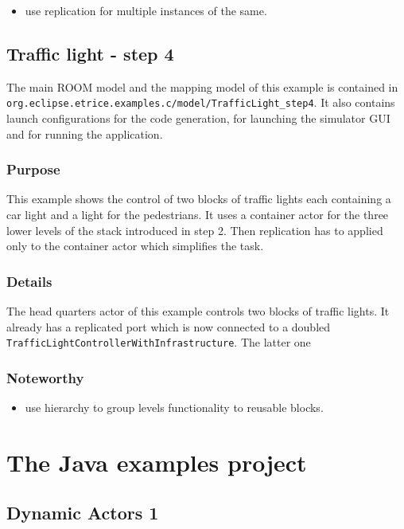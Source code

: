 \begin{itemize}
\item use replication for multiple instances of the same.
\end{itemize}


\subsection{Traffic light - step 4}

The main ROOM model and the mapping model of this example is contained
in \texttt{org.eclipse.etrice.examples.c/model/TrafficLight\_step4}.
It also contains launch configurations for the code generation, for
launching the simulator GUI and for
running the application.

\subsubsection{Purpose}

This example shows the control of two blocks of traffic lights
each containing a car light and a light for the pedestrians.
It uses a container actor for the three lower levels of the stack
introduced in step 2. Then replication has to applied only to the
container actor which simplifies the task.

\subsubsection{Details}

The head quarters actor of this example controls two blocks of traffic
lights. It already has a replicated port which is now connected
to a doubled \texttt{TrafficLightControllerWithInfrastructure}.
The latter one 

\subsubsection{Noteworthy}

\begin{itemize}
\item use hierarchy to group levels functionality to reusable blocks.
\end{itemize}

\section{The Java examples project}

\subsection{Dynamic Actors 1}

